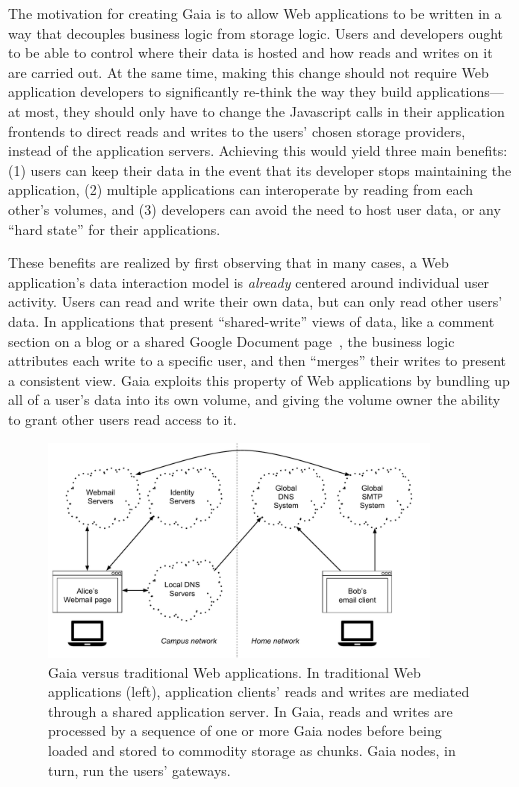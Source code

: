 The motivation for creating Gaia is to allow Web applications to be written in a
way that decouples business logic from storage logic.  Users and developers
ought to be able to control where their data is hosted and how reads and writes
on it are carried out.  At the same time, making this change should not require
Web application developers to significantly re-think the way they build
applications---at most, they should only have to change the Javascript calls in
their application frontends to direct reads and writes to the users' chosen
storage providers, instead of the application servers.  Achieving this would
yield three main benefits:  (1) users can keep their data in the
event that its developer stops maintaining the application, (2) multiple
applications can interoperate by reading from each other's volumes, and
(3) developers can avoid the need to host user data, or any ``hard state'' for
their applications.

These benefits are realized by first observing that in many cases,
a Web application's data interaction model is \emph{already} centered around
individual user activity.  Users can read and write their own data, but can
only read other users' data.
In applications that present ``shared-write'' views of data, like a comment section on a blog or
a shared Google Document page~\cite{google-docs}, the business logic
attributes each write to a specific user, and then ``merges'' their
writes to present a consistent view.  Gaia exploits this property of Web
applications by bundling up all of a user's data into its own volume, and giving
the volume owner the ability to grant other users read access to it.

\begin{figure}[h]
   \centering
   \includegraphics[width=0.9\textwidth,page=16]{figures/dissertation-figures}
   \caption{Gaia versus traditional Web applications.  In traditional Web
   applications (left), application clients' reads and writes are mediated
   through a shared application server.  In Gaia, reads and writes are processed
   by a sequence of one or more Gaia nodes before being loaded and stored to
   commodity storage as chunks.  Gaia nodes, in turn, run the users' gateways.}
   \label{fig:chap3-gaia-vs-traditional-web}
\end{figure}

